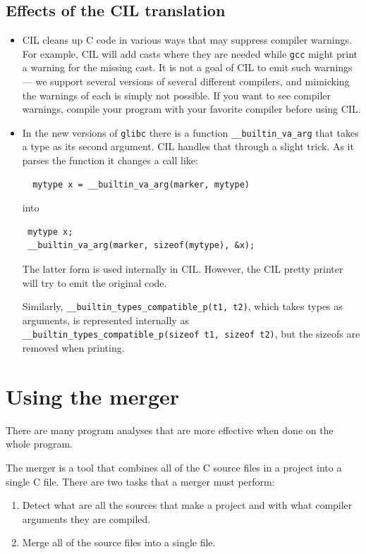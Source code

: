 \documentclass[letterpaper]{article}
\def\t#1{{\tt #1}}
\begin{document}
\subsection{Effects of the CIL translation}
\begin{itemize}
\item CIL cleans up C code in various ways that may suppress compiler
  warnings.  For example, CIL will add casts where they are needed
  while \t{gcc} might print a warning for the missing cast.  It is
  not a goal of CIL to emit such warnings --- we support several
  versions of several different compilers, and mimicking the warnings
  of each is simply not possible.  If you want to see compiler
  warnings, compile your program with your favorite compiler before
  using CIL.


\item In the new versions of \t{glibc} there is a function
  \t{\_\_builtin\_va\_arg} that takes a type as its second argument. CIL
  handles that through a slight trick. As it parses the function it changes a
  call like:
\begin{verbatim}
  mytype x = __builtin_va_arg(marker, mytype)
\end{verbatim}
 into
\begin{verbatim}
 mytype x;
 __builtin_va_arg(marker, sizeof(mytype), &x);
\end{verbatim}

 The latter form is used internally in CIL. However, the CIL pretty printer
 will try to emit the original code.

 Similarly, \t{\_\_builtin\_types\_compatible\_p(t1, t2)}, which takes
 types as arguments, is represented internally as
 \t{\_\_builtin\_types\_compatible\_p(sizeof t1, sizeof t2)}, but the
 sizeofs are removed when printing.

\end{itemize}





  \section{Using the merger}\label{sec-merger}

 There are many program analyses that are more effective when
done on the whole program.

 The merger is a tool that combines all of the C source files in a project
into a single C file. There are two tasks that a merger must perform:
\begin{enumerate}
\item Detect what are all the sources that make a project and with what
compiler arguments they are compiled.

\item Merge all of the source files into a single file.
\end{enumerate}
\end{document}
